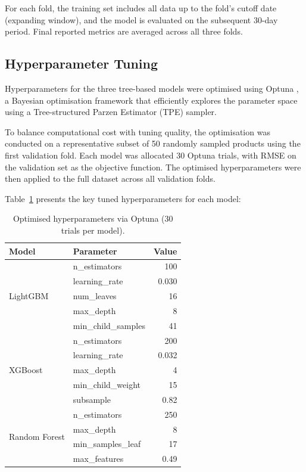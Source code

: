 For each fold, the training set includes all data up to the fold's cutoff date (expanding window), and the model is evaluated on the subsequent 30-day period. Final reported metrics are averaged across all three folds.

\subsection{Hyperparameter Tuning}

Hyperparameters for the three tree-based models were optimised using Optuna \citep{akiba2019optuna}, a Bayesian optimisation framework that efficiently explores the parameter space using a Tree-structured Parzen Estimator (TPE) sampler.

To balance computational cost with tuning quality, the optimisation was conducted on a representative subset of 50 randomly sampled products using the first validation fold. Each model was allocated 30 Optuna trials, with RMSE on the validation set as the objective function. The optimised hyperparameters were then applied to the full dataset across all validation folds.

Table~\ref{tab:tuned_params} presents the key tuned hyperparameters for each model:

\begin{table}[H]
\centering
\small
\caption{Optimised hyperparameters via Optuna (30 trials per model).}
\label{tab:tuned_params}
\begin{tabular}{|l|l|r|}
\hline
\textbf{Model} & \textbf{Parameter} & \textbf{Value} \\
\hline
\multirow{5}{*}{LightGBM} & n\_estimators & 100 \\
 & learning\_rate & 0.030 \\
 & num\_leaves & 16 \\
 & max\_depth & 8 \\
 & min\_child\_samples & 41 \\
\hline
\multirow{5}{*}{XGBoost} & n\_estimators & 200 \\
 & learning\_rate & 0.032 \\
 & max\_depth & 4 \\
 & min\_child\_weight & 15 \\
 & subsample & 0.82 \\
\hline
\multirow{4}{*}{Random Forest} & n\_estimators & 250 \\
 & max\_depth & 8 \\
 & min\_samples\_leaf & 17 \\
 & max\_features & 0.49 \\
\hline
\end{tabular}
\end{table}

